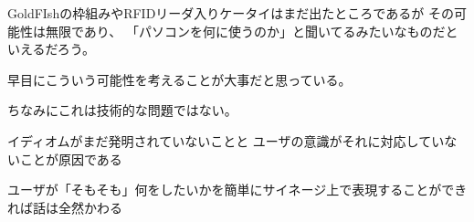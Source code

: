 \documentclass[a4j,11pt,twocolumn]{jarticle}
\begin{document}
GoldFIshの枠組みやRFIDリーダ入りケータイはまだ出たところであるが
その可能性は無限であり、
「パソコンを何に使うのか」と聞いてるみたいなものだといえるだろう。

早目にこういう可能性を考えることが大事だと思っている。





ちなみにこれは技術的な問題ではない。

イディオムがまだ発明されていないことと
ユーザの意識がそれに対応していないことが原因である

ユーザが「そもそも」何をしたいかを簡単にサイネージ上で表現することができれば話は全然かわる
\end{document}
